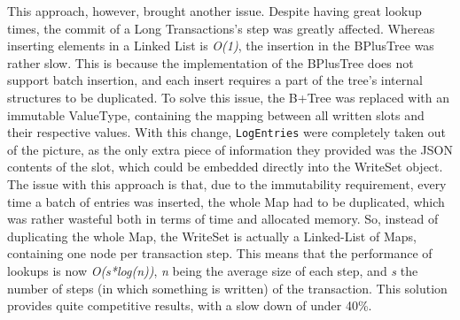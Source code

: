 \documentclass{llncs}
\begin{document}
This approach, however, brought another issue. Despite having great
lookup times, the commit of a Long Transactions's step was greatly
affected. Whereas inserting elements in a Linked List is {\it O(1)},
the insertion in the BPlusTree was rather slow. This is because the
implementation of the BPlusTree does not support batch insertion, and
each insert requires a part of the tree's internal structures to be
duplicated. To solve this issue, the B+Tree was replaced with an
immutable ValueType, containing the mapping between all written slots
and their respective values. With this change, \texttt{LogEntries}
were completely taken out of the picture, as the only extra piece of
information they provided was the JSON contents of the slot, which
could be embedded directly into the WriteSet object. The issue with
this approach is that, due to the immutability requirement, every time
a batch of entries was inserted, the whole Map had to be duplicated,
which was rather wasteful both in terms of time and allocated
memory. So, instead of duplicating the whole Map, the WriteSet is
actually a Linked-List of Maps, containing one node per transaction
step. This means that the performance of lookups is now {\it
  O(s*log(n))}, {\it n} being the average size of each step, and {\it
  s} the number of steps (in which something is written) of the
transaction. This solution provides quite competitive results, with a
slow down of under 40\%.
\end{document}
